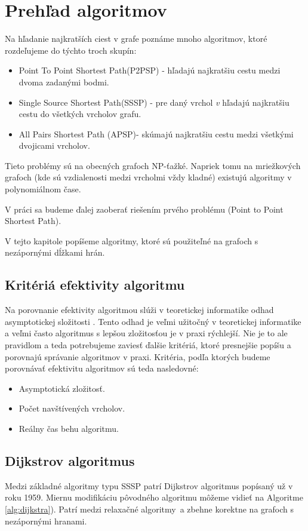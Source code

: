\chapter{Prehľad algoritmov}
Na hľadanie najkratších ciest v grafe poznáme mnoho algoritmov, ktoré rozdeľujeme do týchto troch \cite{mares07} skupín: 


\begin{itemize}
\item Point To Point Shortest Path(P2PSP) - hľadajú najkratšiu cestu medzi dvoma zadanými bodmi.
\item Single Source Shortest Path(SSSP) - pre daný vrchol {\sl v} hľadajú najkratšiu cestu do všetkých vrcholov grafu.
\item All Pairs Shortest Path (APSP)- skúmajú najkratšiu cestu medzi všetkými dvojicami vrcholov.
\end{itemize}

Tieto problémy sú na obecných grafoch NP-ťažké.
Napriek tomu na mriežkových grafoch (kde sú vzdialenosti medzi vrcholmi vždy kladné) existujú algoritmy v polynomiálnom čase.

V práci sa budeme ďalej zaoberať riešením prvého problému (Point to Point Shortest Path). 

V tejto kapitole popíšeme algoritmy, ktoré sú použiteľné na grafoch s nezápornými dĺžkami hrán. 


\section{Kritériá efektivity algoritmu}
Na porovnanie efektivity algoritmou slúži v teoretickej informatike odhad asymptotickej složitosti \cite{asymptotic65}.
Tento odhad je veľmi užitočný v teoretickej informatike a veľmi často algoritmus s lepšou zložitosťou je v praxi rýchlejší.
Nie je to ale pravidlom a teda potrebujeme zaviesť ďalšie kritériá, ktoré presnejšie popíšu a porovnajú správanie algoritmov v praxi.
Kritéria, podľa ktorých budeme porovnávať efektivitu algoritmov sú teda nasledovné:
\begin{itemize}
	\item Asymptotická zložitosť.
	\item Počet navštívených vrcholov.
	\item Reálny čas behu algoritmu.
\end{itemize}



\section{Dijkstrov algoritmus}
Medzi základné algoritmy typu SSSP patrí Dijkstrov algoritmus \cite{dijkstra59} popísaný už v roku 1959. 
Miernu modifikáciu pôvodného algoritmu môžeme vidieť na Algoritme \ref{alg:dijkstra}). 
Patrí medzi relaxačné algoritmy~a zbehne korektne na grafoch
s nezápornými hranami.

